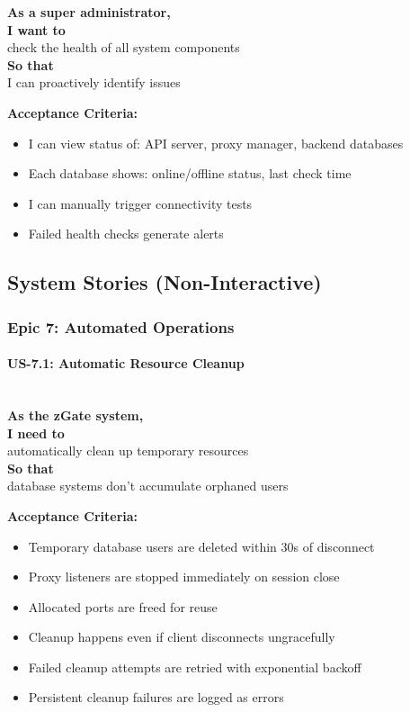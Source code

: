 \noindent\textbf{As a super administrator,} \\
\textbf{I want to} \\
check the health of all system components \\
\textbf{So that} \\
I can proactively identify issues

\noindent\textbf{Acceptance Criteria:}
\begin{itemize}
    \item I can view status of: API server, proxy manager, backend databases
    \item Each database shows: online/offline status, last check time
    \item I can manually trigger connectivity tests
    \item Failed health checks generate alerts
\end{itemize}

\subsection{System Stories (Non-Interactive)}

\subsubsection{Epic 7: Automated Operations}

\paragraph{US-7.1: Automatic Resource Cleanup}
\mbox{}\\[0.5em]

\noindent\textbf{As the zGate system,} \\
\textbf{I need to} \\
automatically clean up temporary resources \\
\textbf{So that} \\
database systems don't accumulate orphaned users

\noindent\textbf{Acceptance Criteria:}
\begin{itemize}
    \item Temporary database users are deleted within 30s of disconnect
    \item Proxy listeners are stopped immediately on session close
    \item Allocated ports are freed for reuse
    \item Cleanup happens even if client disconnects ungracefully
    \item Failed cleanup attempts are retried with exponential backoff
    \item Persistent cleanup failures are logged as errors
\end{itemize}

